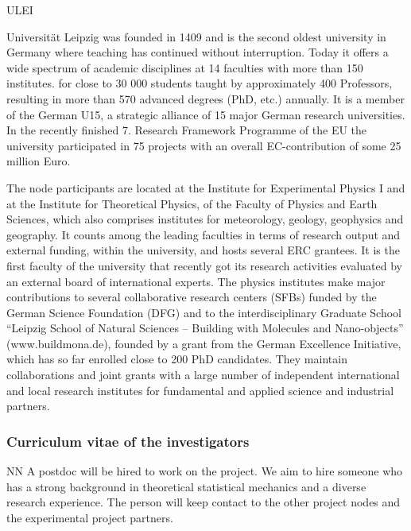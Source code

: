 \begin{sitedescription}{ULEI} \label{desc:ULEI}

 Universität Leipzig was founded in 1409 and is the second oldest university in Germany where teaching has continued 
 without interruption. 
  Today it offers a wide spectrum of academic disciplines at 14 faculties with more than 150 institutes. 
  for close to 30 000 students taught by approximately 400 Professors, 
  resulting in more than 570 advanced degrees (PhD, etc.) annually.
  It is a member of the German U15, a strategic alliance of 15 major German research universities. 
  In the recently finished 7. Research Framework Programme of the EU the university participated 
  in 75 projects with an overall EC-contribution of some 25 million Euro.

  The node participants are located at the Institute for Experimental Physics I and at the Institute for Theoretical Physics, 
  of the Faculty of Physics and Earth Sciences, which also comprises institutes for meteorology, geology, geophysics 
  and geography. 
  It counts among the leading faculties in terms of research output and external funding, within the university, 
  and hosts several ERC grantees. 
  It is the first faculty of the university that recently got its research activities evaluated by an external board of
  international experts. 
  The physics institutes make major contributions to several collaborative research centers (SFBs) funded by the 
  German Science Foundation (DFG) and to the interdisciplinary Graduate School ``Leipzig School of Natural Sciences -- 
  Building with Molecules and Nano-objects'' (www.buildmona.de), founded by a grant from the German Excellence Initiative,
  which has so far enrolled close to 200 PhD candidates. 
  They maintain collaborations and joint grants with a large number of independent international 
  and local research institutes for fundamental and applied science and industrial partners. 

\subsubsection*{Curriculum vitae of the investigators}




\begin{participant}[type=res,PM=48,salary=5500]{NN}
A postdoc will be hired to work on the project. We aim to hire someone who has a strong
background in theoretical statistical mechanics and a diverse research experience. The person will keep contact to the other project nodes and the experimental project partners.
\end{participant}


\end{sitedescription}
